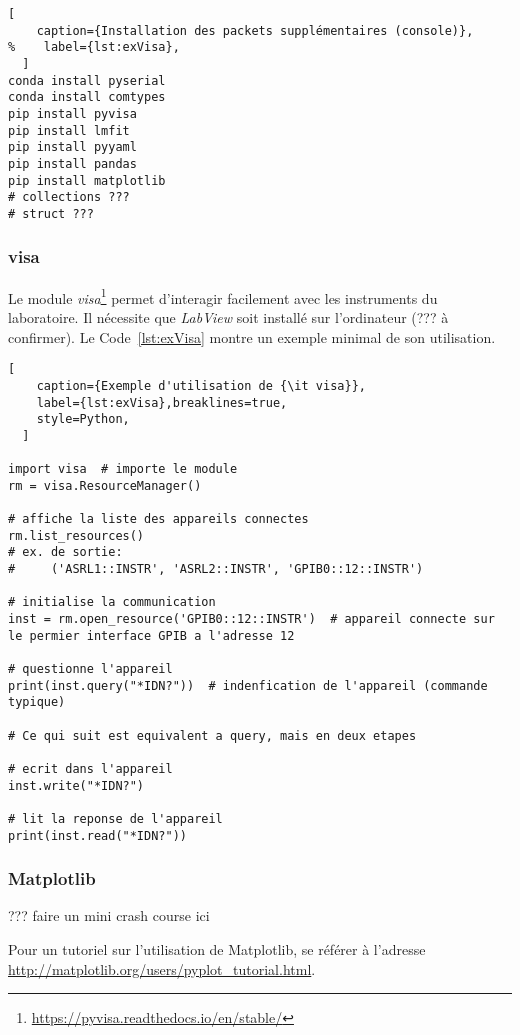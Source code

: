 \documentclass[11pt,francais]{book} %
\begin{document}
\begin{lstlisting}[
    caption={Installation des packets supplémentaires (console)},
%    label={lst:exVisa},
  ]
conda install pyserial
conda install comtypes
pip install pyvisa
pip install lmfit
pip install pyyaml
pip install pandas
pip install matplotlib
# collections ???
# struct ???
\end{lstlisting}


\subsubsection{visa}

Le module {\it visa}\footnote{\url{https://pyvisa.readthedocs.io/en/stable/}} permet d'interagir facilement avec les instruments du laboratoire.
Il nécessite que {\it LabView} soit installé sur l'ordinateur (??? à confirmer).
Le Code~\ref{lst:exVisa} montre un exemple minimal de son utilisation.

\begin{lstlisting}[
    caption={Exemple d'utilisation de {\it visa}},
    label={lst:exVisa},breaklines=true,
    style=Python,
  ]  
 
import visa  # importe le module
rm = visa.ResourceManager()

# affiche la liste des appareils connectes
rm.list_resources()  
# ex. de sortie:
#     ('ASRL1::INSTR', 'ASRL2::INSTR', 'GPIB0::12::INSTR')

# initialise la communication
inst = rm.open_resource('GPIB0::12::INSTR')  # appareil connecte sur le permier interface GPIB a l'adresse 12

# questionne l'appareil
print(inst.query("*IDN?"))  # indenfication de l'appareil (commande typique)

# Ce qui suit est equivalent a query, mais en deux etapes

# ecrit dans l'appareil
inst.write("*IDN?")

# lit la reponse de l'appareil
print(inst.read("*IDN?"))

\end{lstlisting}

\subsubsection{Matplotlib}

??? faire un mini crash course ici

Pour un tutoriel sur l'utilisation de Matplotlib, se référer à l'adresse \url{http://matplotlib.org/users/pyplot_tutorial.html}.
\end{document}
